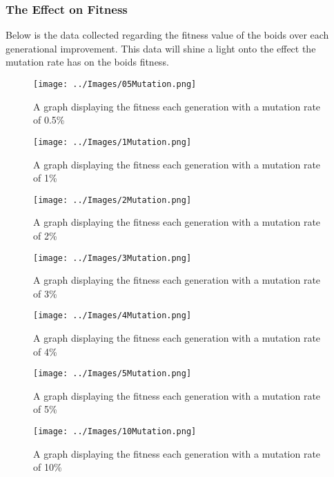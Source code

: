 \subsubsection{The Effect on Fitness}
Below is the data collected regarding the fitness value of the boids over each generational improvement. This data will shine a light onto the effect the mutation rate has on the boids fitness.

\begin{figure}[H]
	\texttt{[image: ../Images/05Mutation.png]}
	\caption{A graph displaying the fitness each generation with a mutation rate of 0.5\%}
	\label{fig:0.5mutation}
\end{figure}

\begin{figure}[H]
	\texttt{[image: ../Images/1Mutation.png]}
	\caption{A graph displaying the fitness each generation with a mutation rate of 1\%}
	\label{fig:1mutation}
\end{figure}

\begin{figure}[H]
	\texttt{[image: ../Images/2Mutation.png]}
	\caption{A graph displaying the fitness each generation with a mutation rate of 2\%}
	\label{fig:2mutation}
\end{figure}

\begin{figure}[H]
	\texttt{[image: ../Images/3Mutation.png]}
	\caption{A graph displaying the fitness each generation with a mutation rate of 3\%}
	\label{fig:3mutation}
\end{figure}

\begin{figure}[H]
	\texttt{[image: ../Images/4Mutation.png]}
	\caption{A graph displaying the fitness each generation with a mutation rate of 4\%}
	\label{fig:4mutation}
\end{figure}

\begin{figure}[H]
	\texttt{[image: ../Images/5Mutation.png]}
	\caption{A graph displaying the fitness each generation with a mutation rate of 5\%}
	\label{fig:5mutation}
\end{figure}

\begin{figure}[H]
	\texttt{[image: ../Images/10Mutation.png]}
	\caption{A graph displaying the fitness each generation with a mutation rate of 10\%}
	\label{fig:10mutation}
\end{figure}

